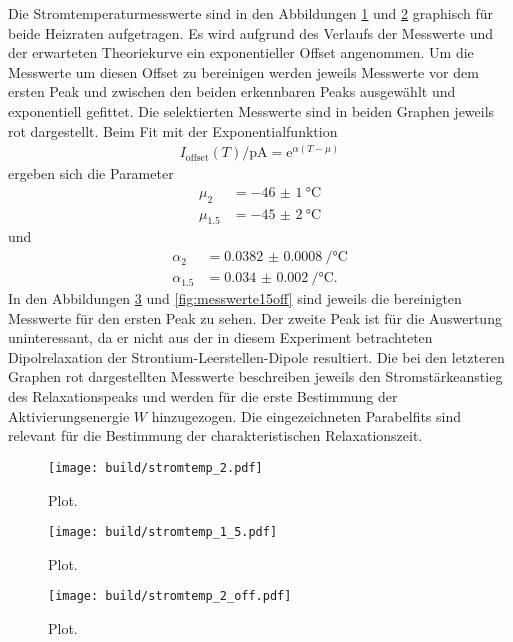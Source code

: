 Die Stromtemperaturmesswerte sind in den Abbildungen \ref{fig:messwerte2} und
\ref{fig:messwerte15} graphisch für beide Heizraten aufgetragen. Es wird
aufgrund des Verlaufs der Messwerte und der erwarteten Theoriekurve ein
exponentieller Offset angenommen. Um die Messwerte um diesen Offset zu bereinigen
werden jeweils Messwerte vor dem ersten Peak und zwischen den beiden erkennbaren
Peaks ausgewählt und exponentiell gefittet. Die selektierten Messwerte sind in beiden
Graphen jeweils rot dargestellt. Beim Fit mit der Exponentialfunktion
\begin{align}
  I_\text{offset}(T)/\si{\pico\ampere} = \mathrm{e}^{\alpha(T-\mu)}
\end{align}
ergeben sich die Parameter
\begin{align}
  \mu_{2} &= \SI{-46(1)}{\celsius} \\
  \mu_{1.5} &= \SI{-45(2)}{\celsius}
\end{align}
und
\begin{align}
  \alpha_{2} &= \SI{0.0382(8)}{\per\celsius} \\
  \alpha_{1.5} &= \SI{0.034(2)}{\per\celsius}.
\end{align}
In den Abbildungen \ref{fig:messwerte2off} und \ref{fig:messwerte15off} sind
jeweils die bereinigten Messwerte für den ersten Peak zu sehen. Der zweite Peak ist
für die Auswertung uninteressant, da er nicht aus der in diesem Experiment
betrachteten Dipolrelaxation der Strontium-Leerstellen-Dipole resultiert.
Die bei den letzteren Graphen rot dargestellten Messwerte beschreiben jeweils den
Stromstärkeanstieg des Relaxationspeaks und werden für die erste Bestimmung der
Aktivierungsenergie $W$ hinzugezogen. Die eingezeichneten Parabelfits sind relevant
für die Bestimmung der charakteristischen Relaxationszeit.

\begin{figure}
  \centering
  \texttt{[image: build/stromtemp\_2.pdf]}
  \caption{Plot.}
  \label{fig:messwerte2}
\end{figure}

\begin{figure}
  \centering
  \texttt{[image: build/stromtemp\_1\_5.pdf]}
  \caption{Plot.}
  \label{fig:messwerte15}
\end{figure}

\begin{figure}
  \centering
  \texttt{[image: build/stromtemp\_2\_off.pdf]}
  \caption{Plot.}
  \label{fig:messwerte2off}
\end{figure}

